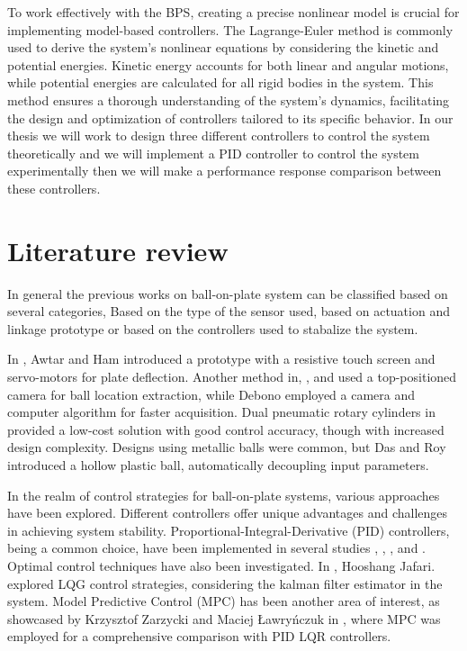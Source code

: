 To work effectively with the BPS, creating a precise nonlinear model is crucial for implementing model-based controllers. The Lagrange-Euler method is commonly used to derive the system's nonlinear equations by considering the kinetic and potential energies. Kinetic energy accounts for both linear and angular motions, while potential energies are calculated for all rigid bodies in the system. This method ensures a thorough understanding of the system's dynamics, facilitating the design and optimization of controllers tailored to its specific behavior.
 In our thesis we will work to design three different controllers to control the system theoretically and we will implement a PID controller to control the system experimentally then we will make a performance response comparison between these controllers.
 
\section{Literature review}
In general the previous works on ball-on-plate system can be classified based on several categories, Based on the type of the sensor used, based on actuation and linkage prototype or based on the controllers used to stabalize the system.

In \cite{awtar2002mechatronic}, \cite{ham2015development} Awtar and Ham introduced a prototype with a resistive touch screen and servo-motors for plate deflection. Another method in\cite{madhumitha2021design}, \cite{zhao2014multiple}, \cite{han2012tracking} and \cite{bdoor2016design} used a top-positioned camera for ball location extraction, while Debono \cite{debono2015application} employed a camera and computer algorithm for faster acquisition.
Dual pneumatic rotary cylinders in \cite{yuan2010modelling} provided a low-cost solution with good control accuracy, though with increased design complexity. Designs using metallic balls were common, but Das and Roy \cite{das2017improved} introduced a hollow plastic ball, automatically decoupling input parameters.

In the realm of control strategies for ball-on-plate systems, various approaches have been explored. Different controllers offer unique advantages and challenges in achieving system stability. Proportional-Integral-Derivative (PID) controllers, being a common choice, have been implemented in several studies \cite{adiprasetya2016implementation}, \cite{stander2017low}, \cite{betancourt2019fuzzy}, \cite{kassem2015commparison} and \cite{fabregas2017virtual}. Optimal control techniques have also been investigated. In \cite{jafari2012linear}, Hooshang Jafari. explored LQG control strategies, considering the kalman filter estimator in the system. Model Predictive Control (MPC) has been another area of interest, as showcased by Krzysztof Zarzycki and Maciej Ławryńczuk in \cite{zarzycki2021fast}, where MPC was employed for a comprehensive comparison with PID LQR controllers.


